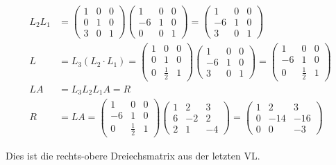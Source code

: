 \documentclass[a4paper,ngerman]{scrbook}
\begin{document}
\begin{align*}
  L_2L_1 &=
  \begin{pmatrix}
    1 & 0 & 0\\
    0 & 1 & 0\\
    3 & 0 & 1
  \end{pmatrix}
  \begin{pmatrix}
    1 & 0 & 0\\
    -6 & 1 & 0\\
    0 & 0 & 1
  \end{pmatrix} =
  \begin{pmatrix}
    1 & 0 & 0\\
    -6 & 1 & 0\\
    3 & 0 & 1
  \end{pmatrix}\\
L &= L_3(L_2\cdot L_1) = 
  \begin{pmatrix}
    1 & 0 & 0\\
    0 & 1 & 0\\
    0 & \frac{1}{2} & 1
  \end{pmatrix}
  \begin{pmatrix}
    1 & 0 & 0\\
    -6 & 1 & 0\\
    3 & 0 & 1
  \end{pmatrix} =
  \begin{pmatrix}
    1 & 0 & 0\\
    -6 & 1 & 0\\
    0 & \frac{1}{2} & 1
  \end{pmatrix}\\
  LA &= L_3L_2L_1A = R\\
  R &= LA =
  \begin{pmatrix}
    1 & 0 & 0\\
    -6 & 1 & 0\\
    0 & \frac{1}{2} & 1
  \end{pmatrix}
  \begin{pmatrix}
    1 & 2 & 3\\
    6 & -2 & 2\\
    2 & 1 & -4
  \end{pmatrix} =
  \begin{pmatrix}
    1 & 2 & 3\\
    0 & -14 & -16\\
    0 & 0 & -3
  \end{pmatrix}
\end{align*}

Dies ist die rechts-obere Dreiechsmatrix aus der letzten VL.
\end{document}
